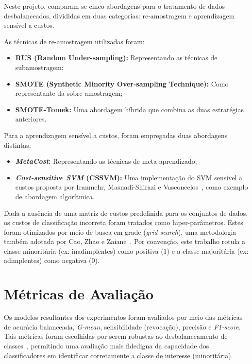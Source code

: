 Neste projeto, comparam-se cinco abordagens para o tratamento de dados desbalanceados, divididas em duas categorias: re-amostragem e aprendizagem sensível a custos.

As técnicas de re-amostragem utilizadas foram:
\begin{itemize}
  \item \textbf{RUS (Random Under-sampling):} Representando as técnicas de subamostragem;
  \item \textbf{SMOTE (Synthetic Minority Over-sampling Technique):} Como representante da sobre-amostragem;
  \item \textbf{SMOTE-Tomek:} Uma abordagem híbrida que combina as duas estratégias anteriores.
\end{itemize}
Para a aprendizagem sensível a custos, foram empregadas duas abordagens distintas:
\begin{itemize}
  \item \textbf{\textit{MetaCost}:} Representando as técnicas de meta-aprendizado;
  \item \textbf{\textit{Cost-sensitive SVM} (CSSVM):} Uma implementação do SVM sensível a custos proposta por Iranmehr, Masnadi-Shirazi e Vasconcelos~\cite{Iranmehr2019}, como exemplo de abordagem algorítmica.
\end{itemize}

Dada a ausência de uma matriz de custos predefinida para os conjuntos de dados, os custos de classificação incorreta foram tratados como hiper-parâmetros. Estes foram otimizados por meio de busca em grade (\textit{grid search}), uma metodologia também adotada por Cao, Zhao e Zaiane~\citeyear{Cao2013}. Por convenção, este trabalho rotula a classe minoritária (ex: inadimplentes) como positiva (1) e a classe majoritária (ex: adimplentes) como negativa (0).

\section{Métricas de Avaliação}\label{sec:metricas}

Os modelos resultantes dos experimentos foram avaliados por meio das métricas de acurácia balanceada, \textit{G-mean}, sensibilidade (revocação), precisão e \textit{F1-score}. Tais métricas foram escolhidas por serem robustas ao desbalanceamento de classes~\cite{Namvar2018,Wei2025}, permitindo uma avaliação mais fidedigna da capacidade dos classificadores em identificar corretamente a classe de interesse (minoritária).

